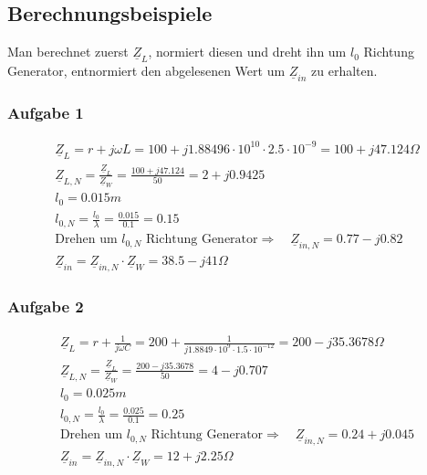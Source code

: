 \documentclass[12pt,a4paper,ngerman]{article}
\begin{document}
\subsection{Berechnungsbeispiele}
Man berechnet zuerst $\underline{Z}_L$, normiert diesen und dreht ihn um $l_0$ Richtung Generator, entnormiert den abgelesenen Wert um $\underline{Z}_{in}$ zu erhalten.
\subsubsection{Aufgabe 1}
\begin{gather}
\underline{Z}_L = r + j\omega L = 100 +j1.88496 \cdot 10^{10} \cdot 2.5 \cdot 10^{-9} = 100 +j47.124 \Omega \\
\underline{Z}_{L,N} = \frac{\underline{Z}_L}{\underline{Z}_W} = \frac{100+j47.124}{50} = 2 + j0.9425 \\
l_0 = 0.015m \\
l_{0,N} = \frac{l_0}{\lambda} = \frac{0.015}{0.1} = 0.15 \\
\text{Drehen um }l_{0,N} \text{ Richtung Generator}\Rightarrow \quad \underline{Z}_{in,N} = 0.77 -j0.82 \\
\underline{Z}_{in} = \underline{Z}_{in,N} \cdot \underline{Z}_W = 38.5 - j41 \Omega
\end{gather}

\subsubsection{Aufgabe 2}
\begin{gather}
\underline{Z}_L = r + \frac{1}{j\omega C} = 200 +\frac{1}{j 1.8849 \cdot 10^9 \cdot 1.5 \cdot 10^{-12}}	 = 200 -j35.3678 \Omega\\
\underline{Z}_{L,N} = \frac{\underline{Z}_L}{\underline{Z}_W} = \frac{200 -j35.3678}{50} = 4-j0.707 \\
l_0 = 0.025m \\
l_{0,N} = \frac{l_0}{\lambda} = \frac{0.025}{0.1} = 0.25 \\
\text{Drehen um }l_{0,N} \text{ Richtung Generator}\Rightarrow \quad \underline{Z}_{in,N} = 0.24 + j0.045 \\
\underline{Z}_{in} = \underline{Z}_{in,N} \cdot \underline{Z}_W = 12+j2.25 \Omega
\end{gather}

\pagebreak
\end{document}
